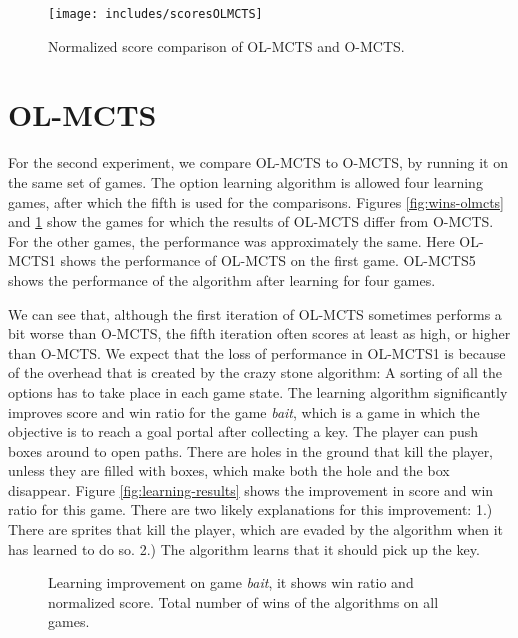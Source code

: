 \begin{figure}
	\centering
	\texttt{[image: includes/scoresOLMCTS]}
	\vspace{-.8cm}
	\caption{Normalized score comparison of OL-MCTS and O-MCTS.}
	\label{fig:scores-olmcts}
\end{figure}

\section{OL-MCTS}
\label{subsec:olmcts}
For the second experiment, we compare OL-MCTS to O-MCTS, by running it on the
same set of games. The option learning algorithm is allowed four learning games,
after which the fifth is used for the comparisons. Figures \ref{fig:wins-olmcts}
and \ref{fig:scores-olmcts} show the games for which the results of OL-MCTS
differ from O-MCTS. For the other games, the performance was approximately the
same. Here OL-MCTS1 shows the performance of OL-MCTS on the first game. OL-MCTS5
shows the performance of the algorithm after learning for four games. 

We can see that, although the first iteration of OL-MCTS sometimes performs a
bit worse than O-MCTS, the fifth iteration often scores at least as high, or
higher than O-MCTS. We expect that the loss of performance in OL-MCTS1 is
because of the overhead that is created by the crazy stone algorithm: A sorting
of all the options has to take place in each game state. The learning algorithm
significantly improves score and win ratio for the game \textit{bait}, which is
a game in which the objective is to reach a goal portal after collecting a key.
The player can push boxes around to open paths. There are holes in the ground
that kill the player, unless they are filled with boxes, which make both the
hole and the box disappear. Figure \ref{fig:learning-results} shows the
improvement in score and win ratio for this game. There are two likely 
explanations for this improvement: 1.) There are sprites that kill the player,
which are evaded by the algorithm when it has learned to do so.  2.) The
algorithm learns that it should pick up the key.

\begin{figure}
	\centering
	\caption{Learning improvement on game \textit{bait}, it shows win ratio and
		normalized score. Total number of wins of the algorithms on
	all games.}
\end{figure}

